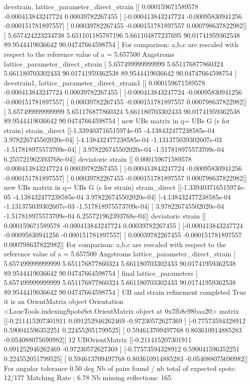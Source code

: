 \documentclass[letterpaper,10pt,english]{sphinxmanual}
\begin{document}
\begin{sphinxalltt}
devstrain, lattice\_parameter\_direct\_strain {[}{[} 0.000159671589578 -0.000413843247724  0.00039782267455 {]}
 {[}-0.000413843247724 -0.00095830941256  -0.000151781897557{]}
 {[} 0.00039782267455  -0.000151781897557  0.000798637822982{]}{]} {[} 5.657424223234738  5.651101185787196  5.661104877237695
 90.01741959362538  89.9544419036642   90.04747664598754 {]}
For comparison: a,b,c are rescaled with respect to the reference value of a = 5.657500 Angstroms
lattice\_parameter\_direct\_strain {[} 5.657499999999999  5.651176877860324  5.661180703302433
 90.01741959362538  89.9544419036642   90.04747664598754 {]}
devstrain1, lattice\_parameter\_direct\_strain1 {[}{[} 0.000159671589578 -0.000413843247724  0.00039782267455 {]}
 {[}-0.000413843247724 -0.00095830941256  -0.000151781897557{]}
 {[} 0.00039782267455  -0.000151781897557  0.000798637822982{]}{]} {[} 5.657499999999999  5.651176877860324  5.661180703302433
 90.01741959362538  89.9544419036642   90.04747664598754 {]}
new UBs matrix in q= UBs G (s for strain)
strain\_direct {[}{[}-1.339403716515974e-05 -4.138432477238585e-04  3.978226745502020e-04{]}
 {[}-4.138432477238585e-04 -1.131375039302607e-03 -1.517818975573709e-04{]}
 {[} 3.978226745502020e-04 -1.517818975573709e-04  6.255721962393768e-04{]}{]}
deviatoric strain {[}{[} 0.000159671589578 -0.000413843247724  0.00039782267455 {]}
 {[}-0.000413843247724 -0.00095830941256  -0.000151781897557{]}
 {[} 0.00039782267455  -0.000151781897557  0.000798637822982{]}{]}
new UBs matrix in q= UBs G (s for strain)
strain\_direct {[}{[}-1.339403716515974e-05 -4.138432477238585e-04  3.978226745502020e-04{]}
 {[}-4.138432477238585e-04 -1.131375039302607e-03 -1.517818975573709e-04{]}
 {[} 3.978226745502020e-04 -1.517818975573709e-04  6.255721962393768e-04{]}{]}
deviatoric strain {[}{[} 0.000159671589578 -0.000413843247724  0.00039782267455 {]}
 {[}-0.000413843247724 -0.00095830941256  -0.000151781897557{]}
 {[} 0.00039782267455  -0.000151781897557  0.000798637822982{]}{]}
For comparison: a,b,c are rescaled with respect to the reference value of a = 5.657500 Angstroms
lattice\_parameter\_direct\_strain {[} 5.657499999999999  5.651176877860324  5.661180703302433
 90.01741959362538  89.9544419036642   90.04747664598754 {]}
final lattice\_parameters {[} 5.657499999999999  5.651176877860324  5.661180703302433
 90.01741959362538  89.9544419036642   90.04747664598754 {]}
UB and strain refinement completed
True it is an OrientMatrix object
Orientation \textless{}LaueTools.indexingSpotsSet.OrientMatrix object at 0x7fb8c98baa20\textgreater{}
matrix {[}{[}-0.211415207301911  0.091252946262469 -0.97230572627369 {]}
 {[}-0.77573594328912   0.590041596352251  0.224552051799525{]}
 {[} 0.594613709497768  0.803610914885283 -0.054088075690982{]}{]}
 12
UBOrientMatrix {[}{[}-0.211415207301911  0.091252946262469 -0.97230572627369 {]}
 {[}-0.77573594328912   0.590041596352251  0.224552051799525{]}
 {[} 0.594613709497768  0.803610914885283 -0.054088075690982{]}{]}
For angular tolerance 0.50 deg
Nb of pairs found / nb total of expected spots: 12/177
Matching Rate : 6.78
Nb missing reflections: 165


\end{sphinxalltt}
\end{document}
